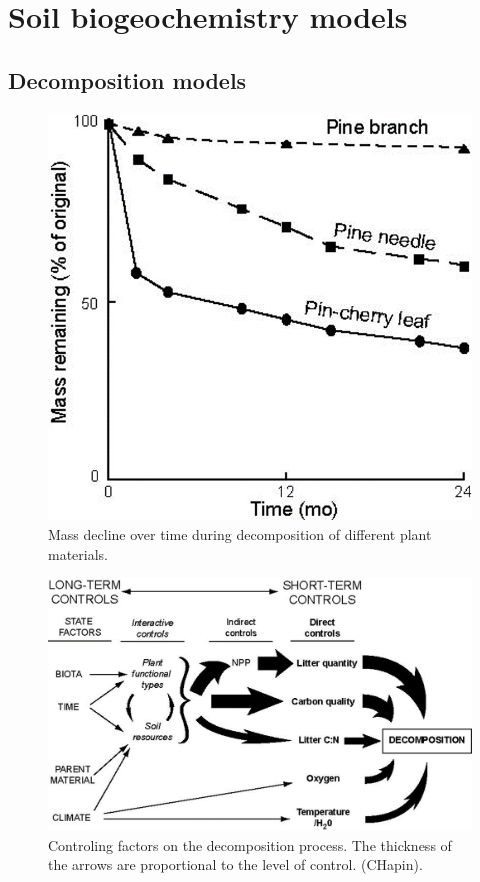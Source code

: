 \documentclass[
  12pt,
  oneside]{book}
\begin{document}
\hypertarget{soil-biogeochemistry-models}{%
\section{Soil biogeochemistry models}\label{soil-biogeochemistry-models}}

\hypertarget{decomposition-models}{%
\subsection{Decomposition models}\label{decomposition-models}}

\begin{figure}

{\centering \includegraphics[width=0.8\linewidth]{figures/chap5/f514_leaf_decomp} 

}

\caption{Mass decline over time during decomposition of different plant materials.}\label{fig:f514}
\end{figure}

\begin{figure}

{\centering \includegraphics[width=0.8\linewidth]{figures/chap5/f514_chapin_decomp_controls} 

}

\caption{Controling factors on the decomposition process. The thickness of the arrows are proportional to the level of control. (CHapin).}\label{fig:f514bis}
\end{figure}
\end{document}
